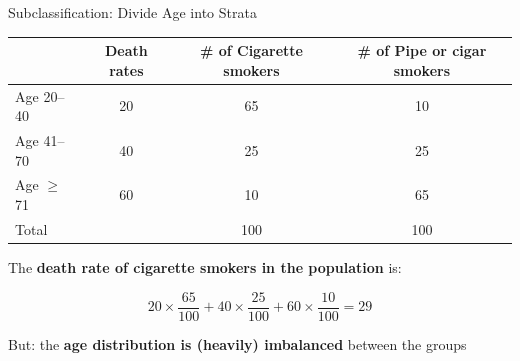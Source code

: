 \documentclass[
  ignorenonframetext,
  aspectratio=169, handout]{beamer}
\begin{document}
\begin{frame}{Subclassification: Divide Age into Strata}
\protect\hypertarget{subclassification-divide-age-into-strata-1}{}
\begin{center}
\begin{tabular}{lccc}
\hline
                & Death rates & \# of Cigarette smokers & \# of Pipe or cigar smokers \\ \hline
Age 20–40       & \cellcolor{green!25}20          & \cellcolor{green!25}65                       & 10                          \\
Age 41–70       & \cellcolor{green!25}40          & \cellcolor{green!25}25                       & 25                          \\
Age $\geq$ 71   & \cellcolor{green!25}60          & \cellcolor{green!25}10                       & 65                          \\
Total           &             & 100                      & 100                         \\ \hline
\end{tabular}
\end{center}

The \textbf{death rate of cigarette smokers in the population} is:

\[20 \times \dfrac{65}{100} + 40 \times \dfrac{25}{100} + 60 \times \dfrac{10}{100}=29\]

\vfill

But: the \textbf{age distribution is (heavily) imbalanced} between the
groups
\end{frame}
\end{document}
